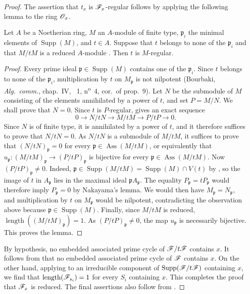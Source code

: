 \begin{proof}
The assertion that $t_x$ is $\mathscr{F}_x$-regular follows by applying the following lemma to the ring $\mathscr{O}_x$.

\begin{lemma}[3.4.6.1]
\label{IV.3.4.6.1}
Let $A$ be a Noetherian ring, $M$ an $A$-module of finite type, $\mathfrak p_i$ the minimal elements of $\operatorname{Supp}(M)$, and $t\in A$.
Suppose that $t$ belongs to none of the $\mathfrak p_i$ and that $M/tM$ is a reduced $A$-module .
Then $t$ is $M$-regular.
\end{lemma}

\begin{proof}
Every prime ideal $\mathfrak p\in\operatorname{Supp}(M)$ contains one of the $\mathfrak p_i$.
Since $t$ belongs to none of the $\mathfrak p_i$, multiplication by $t$ on $M_{\mathfrak p}$ is not nilpotent (Bourbaki, \emph{Alg.\ comm.}, chap.~IV, \textsection~1, n\textsuperscript{o}~4, cor.\ of prop.~9).
Let $N$ be the submodule of $M$ consisting of the elements annihilated by a power of $t$, and set $P=M/N$.
We shall prove that $N=0$.
Since $t$ is $P$-regular,  gives an exact sequence
\[
0\longrightarrow N/tN
 \longrightarrow M/tM
 \longrightarrow P/tP
 \longrightarrow 0.
\]
Since $N$ is of finite type, it is annihilated by a power of $t$, and it therefore suffices to prove that $N/tN=0$.
As $N/tN$ is a submodule of $M/tM$, it suffices to prove that $(N/tN)_{\mathfrak p}=0$ for every $\mathfrak p\in\operatorname{Ass}(M/tM)$, or equivalently that $u_{\mathfrak p}:(M/tM)_{\mathfrak p}\longrightarrow(P/tP)_{\mathfrak p}$
is bijective for every $\mathfrak p\in\operatorname{Ass}(M/tM)$.
Now $(P/tP)_{\mathfrak p}\neq 0$.
Indeed, $\mathfrak p\in\operatorname{Supp}(M/tM)
=\operatorname{Supp}(M)\cap V(t)$
by , so the image of $t$ in $A_{\mathfrak p}$ lies in the maximal ideal $\mathfrak pA_{\mathfrak p}$.
The equality $P_{\mathfrak p}=tP_{\mathfrak p}$ would therefore imply $P_{\mathfrak p}=0$ by Nakayama's lemma.
We would then have $M_{\mathfrak p}=N_{\mathfrak p}$, and multiplication by $t$ on $M_{\mathfrak p}$ would be nilpotent, contradicting the observation above because $\mathfrak p\in\operatorname{Supp}(M)$.
Finally, since $M/tM$ is reduced, $\operatorname{length}((M/tM)_{\mathfrak p})=1$.
As $(P/tP)_{\mathfrak p}\neq 0$, the map $u_{\mathfrak p}$ is necessarily bijective.
This proves the lemma.
\end{proof}

By hypothesis, no embedded associated prime cycle of $\mathscr{F}/t\mathscr{F}$ contains $x$.
It follows from  that no embedded associated prime cycle of $\mathscr{F}$ contains $x$.
On the other hand, applying  to an irreducible component of $\operatorname{Supp}(\mathscr{F}/t\mathscr{F})$ containing $x$, we find that $\operatorname{length}(\mathscr{F}_{s_i})=1$ for every $S_i$ containing $x$.
This completes the proof that $\mathscr{F}_x$ is reduced.
The final assertions also follow from .
\end{proof}


